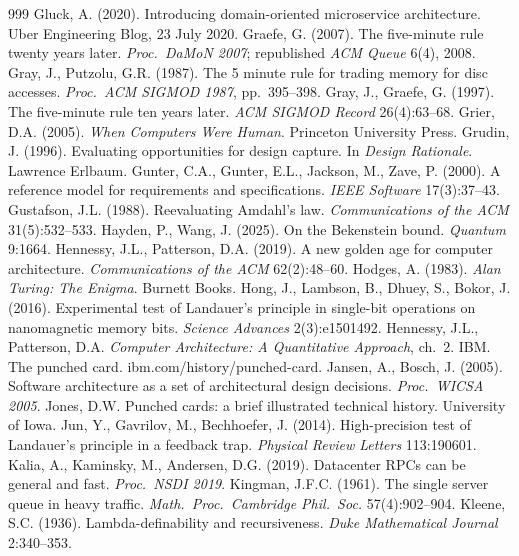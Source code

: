 \documentclass[11pt,oneside]{article}
\theoremstyle{definition}
\theoremstyle{remark}
\begin{document}
\begin{thebibliography}{999}
 Gluck, A. (2020). Introducing domain-oriented microservice architecture. Uber Engineering Blog, 23 July 2020.
 Graefe, G. (2007). The five-minute rule twenty years later. \emph{Proc.\ DaMoN 2007}; republished \emph{ACM Queue} 6(4), 2008.
 Gray, J., Putzolu, G.R. (1987). The 5 minute rule for trading memory for disc accesses. \emph{Proc.\ ACM SIGMOD 1987}, pp.~395--398.
 Gray, J., Graefe, G. (1997). The five-minute rule ten years later. \emph{ACM SIGMOD Record} 26(4):63--68.
 Grier, D.A. (2005). \emph{When Computers Were Human}. Princeton University Press.
 Grudin, J. (1996). Evaluating opportunities for design capture. In \emph{Design Rationale}. Lawrence Erlbaum.
 Gunter, C.A., Gunter, E.L., Jackson, M., Zave, P. (2000). A reference model for requirements and specifications. \emph{IEEE Software} 17(3):37--43.
 Gustafson, J.L. (1988). Reevaluating Amdahl's law. \emph{Communications of the ACM} 31(5):532--533.
 Hayden, P., Wang, J. (2025). On the Bekenstein bound. \emph{Quantum} 9:1664.
 Hennessy, J.L., Patterson, D.A. (2019). A new golden age for computer architecture. \emph{Communications of the ACM} 62(2):48--60.
 Hodges, A. (1983). \emph{Alan Turing: The Enigma}. Burnett Books.
 Hong, J., Lambson, B., Dhuey, S., Bokor, J. (2016). Experimental test of Landauer's principle in single-bit operations on nanomagnetic memory bits. \emph{Science Advances} 2(3):e1501492.
 Hennessy, J.L., Patterson, D.A. \emph{Computer Architecture: A Quantitative Approach}, ch.~2.
 IBM. The punched card. ibm.com/history/punched-card.
 Jansen, A., Bosch, J. (2005). Software architecture as a set of architectural design decisions. \emph{Proc.\ WICSA 2005}.
 Jones, D.W. Punched cards: a brief illustrated technical history. University of Iowa.
 Jun, Y., Gavrilov, M., Bechhoefer, J. (2014). High-precision test of Landauer's principle in a feedback trap. \emph{Physical Review Letters} 113:190601.
 Kalia, A., Kaminsky, M., Andersen, D.G. (2019). Datacenter RPCs can be general and fast. \emph{Proc.\ NSDI 2019}.
 Kingman, J.F.C. (1961). The single server queue in heavy traffic. \emph{Math.\ Proc.\ Cambridge Phil.\ Soc.} 57(4):902--904.
 Kleene, S.C. (1936). Lambda-definability and recursiveness. \emph{Duke Mathematical Journal} 2:340--353.

\end{thebibliography}
\end{document}
